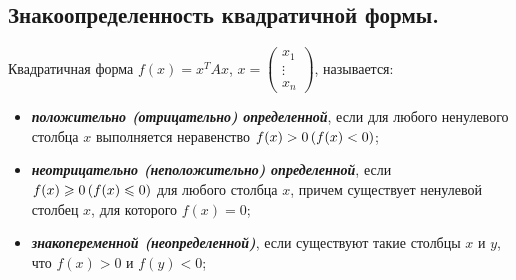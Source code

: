 \subsection{
    Знакоопределенность квадратичной формы.
}

\begin{definition}
    Квадратичная форма $f(x) = x^TAx$, $x = \begin{pmatrix}
        x_1 \\
        \vdots \\
        x_n
    \end{pmatrix}$, называется:

    \begin{itemize}
        \item \textbf{\textit{положительно (отрицательно) определенной}}, если для любого ненулевого столбца $x$ выполняется неравенство $f(x) > 0 \thinspace (f(x) < 0)$;
        \item \textbf{\textit{неотрицательно (неположительно) определенной}}, если $f(x) \geq 0 \thinspace (f(x) \leq 0)$ для любого столбца $x$, причем существует ненулевой столбец $x$, для которого $f(x) = 0$;
        \item \textbf{\textit{знакопеременной (неопределенной)}}, если существуют такие столбцы $x$ и $y$, что $f(x) > 0$ и $f(y) < 0$;
    \end{itemize}
\end{definition}
